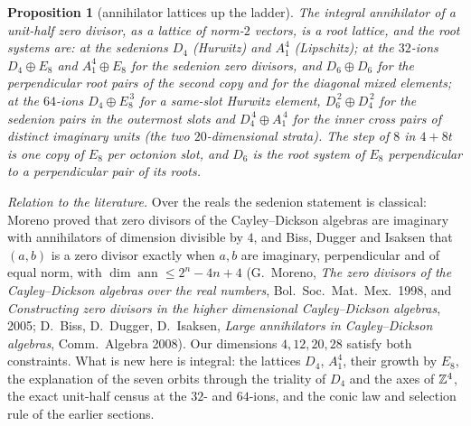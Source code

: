 \documentclass[11pt]{amsart}
\newtheorem{proposition}[theorem]{Proposition}
\theoremstyle{definition}
\begin{document}
\begin{proposition}[annihilator lattices up the ladder]\label{prop:annladder}
The integral annihilator of a unit-half zero divisor, as a lattice of norm-$2$ vectors, is a root lattice, and the root systems are: at the sedenions $D_4$ (Hurwitz) and $A_1^4$ (Lipschitz); at the $32$-ions $D_4\oplus E_8$ and $A_1^4\oplus E_8$ for the sedenion zero divisors, and $D_6\oplus D_6$ for the perpendicular root pairs of the second copy and for the diagonal mixed elements; at the $64$-ions $D_4\oplus E_8^{\,3}$ for a same-slot Hurwitz element, $D_6^{\,2}\oplus D_4^{\,2}$ for the sedenion pairs in the outermost slots and $D_4^{\,4}\oplus A_1^{\,4}$ for the inner cross pairs of distinct imaginary units (the two $20$-dimensional strata). The step of $8$ in $4+8t$ is one copy of $E_8$ per octonion slot, and $D_6$ is the root system of $E_8$ perpendicular to a perpendicular pair of its roots.
\end{proposition}
\noindent\emph{Relation to the literature.} Over the reals the sedenion statement is classical: Moreno proved that zero divisors of the Cayley--Dickson algebras are imaginary with annihilators of dimension divisible by $4$, and Biss, Dugger and Isaksen that $(a,b)$ is a zero divisor exactly when $a,b$ are imaginary, perpendicular and of equal norm, with $\dim\operatorname{ann}\le 2^n-4n+4$ (G.~Moreno, \emph{The zero divisors of the Cayley--Dickson algebras over the real numbers}, Bol.\ Soc.\ Mat.\ Mex.\ 1998, and \emph{Constructing zero divisors in the higher dimensional Cayley--Dickson algebras}, 2005; D.~Biss, D.~Dugger, D.~Isaksen, \emph{Large annihilators in Cayley--Dickson algebras}, Comm.\ Algebra 2008). Our dimensions $4,12,20,28$ satisfy both constraints. What is new here is integral: the lattices $D_4$, $A_1^4$, their growth by $E_8$, the explanation of the seven orbits through the triality of $D_4$ and the axes of $\mathbb{Z}^4$, the exact unit-half census at the $32$- and $64$-ions, and the conic law and selection rule of the earlier sections.
\end{document}
